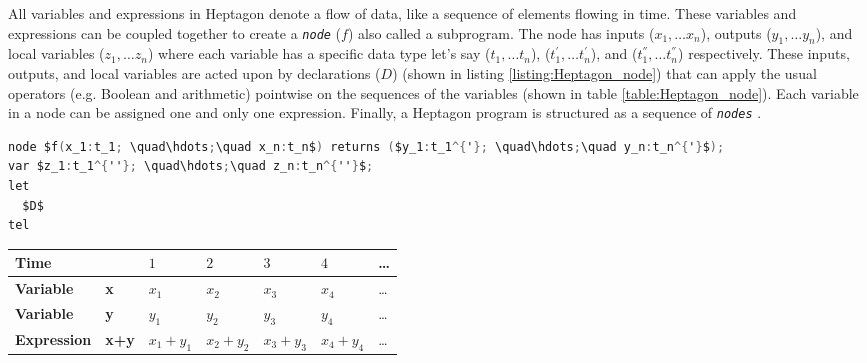 \documentclass[10pt, a4paper]{article}
\newcommand{\textFunc}[1]{\texttt{\textit{#1}}}
\begin{document}
    All variables and expressions in Heptagon denote a flow of data, like a sequence of elements flowing in time. These variables and expressions can be coupled together to create a \textFunc{node} ($f$) also called a subprogram. The node has inputs ($x_1, \dots x_n$), outputs ($y_1, \dots y_n$), and local variables ($z_1, \dots z_n$) where each variable has a specific data type let's say ($t_1, \dots t_n$), ($t_1^{'}, \dots t_n^{'}$), and ($t_1^{''}, \dots t_n^{''}$) respectively. These inputs, outputs, and local variables are acted upon by declarations ($D$) (shown in listing \ref{listing:Heptagon_node}) that can apply the usual operators (e.g. Boolean and arithmetic) pointwise on the sequences of the variables (shown in table \ref{table:Heptagon_node}). Each variable in a node can be assigned one and only one expression. Finally, a Heptagon program is structured as a sequence of \textFunc{nodes} \cite{report:heptagon_manual}.
    \clearpage

    \begin{lstlisting}[caption={A node in Heptagon}, label={listing:Heptagon_node}, language=C]
node $f(x_1:t_1; \quad\hdots;\quad x_n:t_n$) returns ($y_1:t_1^{'}; \quad\hdots;\quad y_n:t_n^{'}$);
var $z_1:t_1^{''}; \quad\hdots;\quad z_n:t_n^{''}$;
let
  $D$
tel     \end{lstlisting}

    \begin{minipage}{\linewidth}
    \centering
    \label{table:Heptagon_node} 
    \begin{tabular}{ C{0.95in} | C{.38in} | *5{C{.38in}}}\toprule[1.5pt]
        \toprule[1.5pt]
        \bf Time    &        & $1$ & $2$ & $3$ & $4$ & \dots \\
        \midrule
        \bf Variable & \bf x & $x_1$ & $x_2$ & $x_3$ & $x_4$ & \dots \\
        \midrule
        \bf Variable & \bf y & $y_1$ & $y_2$ & $y_3$ & $y_4$ & \dots \\
        \midrule
        \bf Expression & \bf x+y & $x_1 + y_1$ & $x_2 + y_2$ & $x_3 + y_3$ & $x_4 + y_4$ & \dots \\
        \bottomrule[1.25pt]
    \end{tabular}\par
    \end{minipage}
\end{document}
